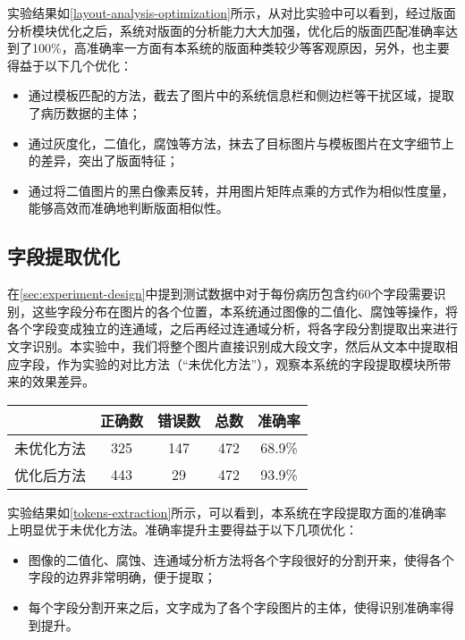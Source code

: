 实验结果如\autoref{layout-analysis-optimization}所示，从对比实验中可以看到，经过版面分析模块优化之后，系统对版面的分析能力大大加强，优化后的版面匹配准确率达到了100\%，高准确率一方面有本系统的版面种类较少等客观原因，另外，也主要得益于以下几个优化：
\begin{itemize}
  \item 通过模板匹配的方法，截去了图片中的系统信息栏和侧边栏等干扰区域，提取了病历数据的主体；
  \item 通过灰度化，二值化，腐蚀等方法，抹去了目标图片与模板图片在文字细节上的差异，突出了版面特征；
  \item 通过将二值图片的黑白像素反转，并用图片矩阵点乘的方式作为相似性度量，能够高效而准确地判断版面相似性。
\end{itemize}

\subsection{字段提取优化}
在\autoref{sec:experiment-design}中提到测试数据中对于每份病历包含约60个字段需要识别，这些字段分布在图片的各个位置，本系统通过图像的二值化、腐蚀等操作，将各个字段变成独立的连通域，之后再经过连通域分析，将各字段分割提取出来进行文字识别。本实验中，我们将整个图片直接识别成大段文字，然后从文本中提取相应字段，作为实验的对比方法（“未优化方法”），观察本系统的字段提取模块所带来的效果差异。
\begin{table}[!htbp]
	\label{tokens-extraction}
	\centering
	\vspace{10pt}
  \renewcommand\arraystretch{1.5}  %
	\begin{tabular}{c||c|c|c|c}
    \hline
    & 正确数 & 错误数 & 总数 & 准确率 \\
		\hline
    未优化方法 & 325 & 147 & 472 & 68.9\% \\
		\hline
    优化后方法 & 443 & 29 & 472 & 93.9\% \\
    \hline
	\end{tabular}
\end{table}

实验结果如\autoref{tokens-extraction}所示，可以看到，本系统在字段提取方面的准确率上明显优于未优化方法。准确率提升主要得益于以下几项优化：
\begin{itemize}
  \item 图像的二值化、腐蚀、连通域分析方法将各个字段很好的分割开来，使得各个字段的边界非常明确，便于提取；
  \item 每个字段分割开来之后，文字成为了各个字段图片的主体，使得识别准确率得到提升。
\end{itemize}

